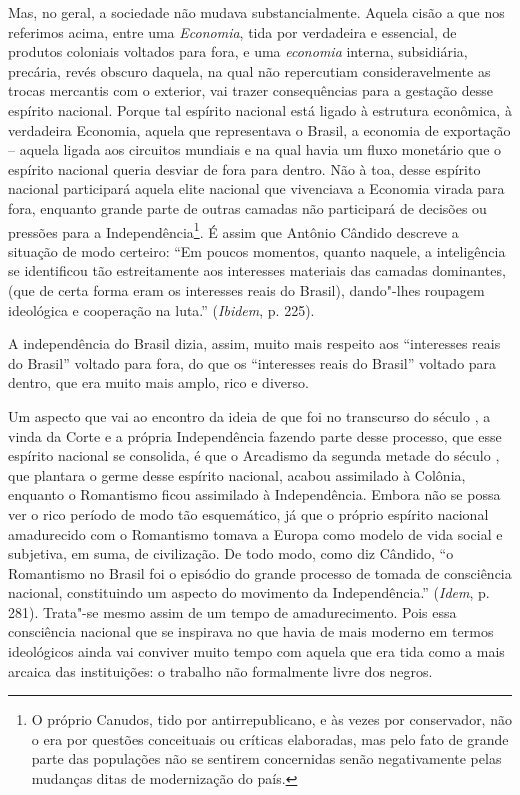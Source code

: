 {Mas, no geral, a sociedade não mudava substancialmente. Aquela cisão a
que nos referimos acima, entre uma \emph{Economia}, tida por verdadeira
e essencial, de produtos coloniais voltados para fora, e uma
\emph{economia} interna, subsidiária, precária, revés obscuro daquela,
na qual não repercutiam consideravelmente as trocas mercantis com o
exterior, vai trazer consequências para a gestação desse espírito
nacional. Porque tal espírito nacional está ligado à estrutura
econômica, à verdadeira Economia, aquela que representava o Brasil, a
economia de exportação -- aquela ligada aos circuitos mundiais e na qual
havia um fluxo monetário que o espírito nacional queria desviar de fora
para dentro. Não à toa, desse espírito nacional participará aquela elite
nacional que vivenciava a Economia virada para fora, enquanto grande
parte de outras camadas não participará de decisões ou pressões para a
Independência\footnote{O próprio Canudos, tido por antirrepublicano, e
  às vezes por conservador, não o era por questões conceituais ou críticas elaboradas,
  mas pelo fato de grande parte das populações não se sentirem concernidas senão
  negativamente pelas mudanças ditas de modernização do país.}. É assim
que Antônio Cândido descreve a situação de modo certeiro: ``Em poucos
momentos, quanto naquele, a inteligência se identificou tão
estreitamente aos interesses materiais das camadas dominantes, (que de
certa forma eram os interesses reais do Brasil), dando"-lhes roupagem
ideológica e cooperação na luta.'' (\emph{Ibidem}, p. 225).

A independência do Brasil dizia, assim, muito mais respeito aos
``interesses reais do Brasil'' voltado para fora, do que os ``interesses
reais do Brasil'' voltado para dentro, que era muito mais amplo, rico e
diverso.

Um aspecto que vai ao encontro da ideia de que foi no transcurso do
século , a vinda da Corte e a própria Independência fazendo parte
desse processo, que esse espírito nacional se consolida, é que o
Arcadismo da segunda metade do século , que plantara o germe desse
espírito nacional, acabou assimilado à Colônia, enquanto o Romantismo
ficou assimilado à Independência. Embora não se possa ver o rico período
de modo tão esquemático, já que o próprio espírito nacional amadurecido
com o Romantismo tomava a Europa como modelo de vida social e subjetiva,
em suma, de civilização. De todo modo, como diz Cândido, ``o Romantismo
no Brasil foi o episódio do grande processo de tomada de consciência
nacional, constituindo um aspecto do movimento da Independência.''
(\emph{Idem}, p. 281). Trata"-se mesmo assim de um tempo de
amadurecimento. Pois essa consciência nacional que se inspirava no que
havia de mais moderno em termos ideológicos ainda vai conviver muito
tempo com aquela que era tida como a mais arcaica das instituições: o
trabalho não formalmente livre dos negros.

}
